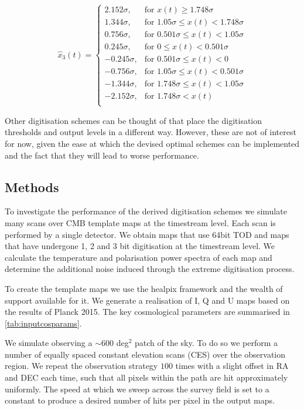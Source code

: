 \documentclass[apj]{emulateapj}
\newcommand{\sqdeg}{deg$^2$ }
\begin{document}
\[ \hat{x}_3(t) = \left\{ \begin{array}{rl}
2.152 \sigma, & \text{for } x(t) \geq 1.748 \sigma\\
1.344 \sigma, & \text{for } 1.05 \sigma \leq x(t) < 1.748 \sigma\\
0.756 \sigma, & \text{for } 0.501 \sigma \leq x(t) < 1.05 \sigma\\
0.245 \sigma, & \text{for } 0 \leq x(t) < 0.501 \sigma\\
-0.245 \sigma, & \text{for } 0.501 \sigma \leq x(t) < 0\\
-0.756 \sigma, & \text{for } 1.05 \sigma \leq x(t) < 0.501 \sigma\\
-1.344 \sigma, & \text{for } 1.748 \sigma \leq x(t) < 1.05 \sigma\\
-2.152 \sigma, & \text{for } 1.748 \sigma < x(t)\\
\end{array} \right. \]

Other digitisation schemes can be thought of that place the digitisation thresholds and output levels in a different way. However, these are not of interest for now, given the ease at which the devised optimal schemes can be implemented and the fact that they will lead to worse performance.


\subsection{Methods}
\label{subsec:method}

To investigate the performance of the derived digitisation schemes we simulate many scans over CMB template maps at the timestream level. Each scan is performed by a single detector. We obtain maps that use 64bit TOD and maps that have undergone 1, 2 and 3 bit digitisation at the timestream level. We calculate the temperature and polarisation power spectra of each map and determine the additional noise induced through the extreme digitisation process.

To create the template maps we use the healpix framework and the wealth of support available for it. We generate a realisation of I, Q and U maps based on the results of Planck 2015. The key cosmological parameters are summarised in \ref{tab:inputcosparams}.

We simulate observing a $\sim 600$ \sqdeg patch of the sky. To do so we perform a number of equally spaced constant elevation scans (CES) over the observation region. We repeat the observation strategy $100$ times with a slight offset in RA and DEC each time, such that all pixels within the path are hit approximately uniformly. The speed at which we sweep across the survey field is set to a constant to produce a desired number of hits per pixel in the output maps.
\end{document}

